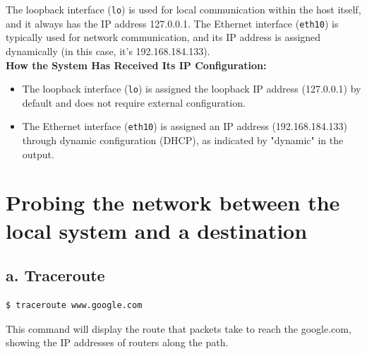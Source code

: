 \documentclass{report}
\begin{document}
The loopback interface (\texttt{lo}) is used for local communication within the host itself, and it always has the IP address 127.0.0.1.
The Ethernet interface (\texttt{eth10}) is typically used for network communication, and its IP address is assigned dynamically (in this case, it's 192.168.184.133).\cite{5} \\



\textbf{How the System Has Received Its IP Configuration:}
\begin{itemize}
  \item The loopback interface (\texttt{lo}) is assigned the loopback IP address (127.0.0.1) by default and does not require external configuration.
  \item The Ethernet interface (\texttt{eth10}) is assigned an IP address (192.168.184.133) through dynamic configuration (DHCP), as indicated by "dynamic" in the output. 
\end{itemize}


\section*{Probing the network between the local system and a destination}

\subsection*{a. Traceroute}

\begin{lstlisting}[language=bash]
  $ traceroute www.google.com
  \end{lstlisting}

This command will display the route that packets take to reach the google.com, showing the IP addresses of routers along the path.
\end{document}
